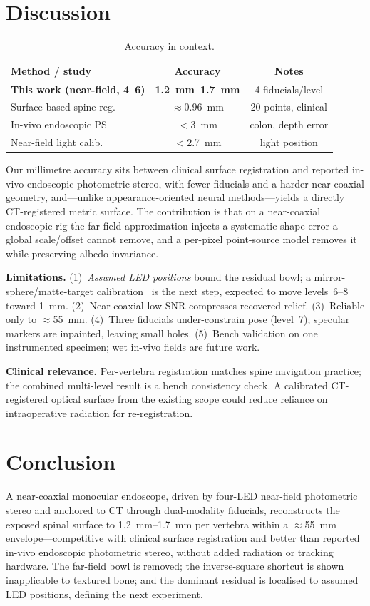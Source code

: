 \documentclass[11pt]{article}
\begin{document}
\section{Discussion}
\begin{table}[h]\centering
\caption{Accuracy in context.}
\begin{tabular}{lcc}
\toprule
Method / study & Accuracy & Notes\\
\midrule
\textbf{This work (near-field, 4--6)} & \textbf{\SIrange{1.2}{1.7}{\mm}} & 4 fiducials/level\\
Surface-based spine reg.~\cite{spine} & $\approx$\SI{0.96}{\mm} & 20 points, clinical\\
In-vivo endoscopic PS~\cite{colon} & $<$\SI{3}{\mm} & colon, depth error\\
Near-field light calib.~\cite{aocalib} & $<$\SI{2.7}{\mm} & light position\\
\bottomrule
\end{tabular}
\end{table}

Our millimetre accuracy sits between clinical surface registration and reported
in-vivo endoscopic photometric stereo, with fewer fiducials and a harder near-coaxial
geometry, and---unlike appearance-oriented neural methods---yields a directly
CT-registered metric surface. The contribution is that on a near-coaxial endoscopic
rig the far-field approximation injects a systematic shape error a global scale/offset
cannot remove, and a per-pixel point-source model removes it while preserving
albedo-invariance.

\textbf{Limitations.} (1)~\emph{Assumed LED positions} bound the residual bowl; a
mirror-sphere/matte-target calibration~\cite{queau,aocalib} is the next step,
expected to move levels~6--8 toward \SI{1}{\mm}. (2)~Near-coaxial low SNR compresses
recovered relief. (3)~Reliable only to $\approx$\SI{55}{\mm}. (4)~Three fiducials
under-constrain pose (level~7); specular markers are inpainted, leaving small holes.
(5)~Bench validation on one instrumented specimen; wet in-vivo fields are future work.

\textbf{Clinical relevance.} Per-vertebra registration matches spine navigation
practice; the combined multi-level result is a bench consistency check. A calibrated
CT-registered optical surface from the existing scope could reduce reliance on
intraoperative radiation for re-registration.

\section{Conclusion}
A near-coaxial monocular endoscope, driven by four-LED near-field photometric stereo
and anchored to CT through dual-modality fiducials, reconstructs the exposed spinal
surface to \SIrange{1.2}{1.7}{\mm} per vertebra within a $\approx$\SI{55}{\mm}
envelope---competitive with clinical surface registration and better than reported
in-vivo endoscopic photometric stereo, without added radiation or tracking hardware.
The far-field bowl is removed; the inverse-square shortcut is shown inapplicable to
textured bone; and the dominant residual is localised to assumed LED positions,
defining the next experiment.
\end{document}
